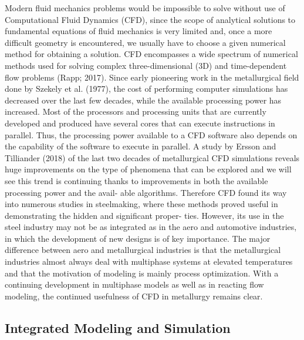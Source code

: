 Modern fluid mechanics problems would be impossible to solve without use of Computational Fluid Dynamics (CFD), since the scope of analytical solutions to fundamental equations of fluid mechanics is very limited and, once a more difficult geometry is encountered, we usually have to choose a given numerical method for obtaining a solution. CFD encompasses a wide spectrum of numerical methods used for solving complex three-dimensional (3D) and time-dependent flow problems (Rapp; 2017). Since early pioneering work in the metallurgical field done by Szekely et al. (1977), the cost of performing computer simulations has decreased over the last few decades, while the available processing power has increased. Most of the processors and processing units that are currently developed and produced have several cores that can execute instructions in parallel. Thus, the processing power available to a CFD software also depends on the capability of the software to execute in parallel. A study by Ersson and Tilliander (2018) of the last two decades of metallurgical CFD simulations reveals huge improvements on the type of phenomena that can be explored and we will see this trend is continuing thanks to improvements in both the available processing power and the avail- able algorithms. Therefore CFD found its way into numerous studies in steelmaking, where these methods proved useful in demonstrating the hidden and significant proper- ties. However, its use in the steel industry may not be as integrated as in the aero and automotive industries, in which the development of new designs is of key importance. The major difference between aero and metallurgical industries is that the metallurgical industries almost always deal with multiphase systems at elevated temperatures and that the motivation of modeling is mainly process optimization. With a continuing development in multiphase models as well as in reacting flow modeling, the continued usefulness of CFD in metallurgy remains clear.

\subsection{Integrated Modeling and Simulation}



